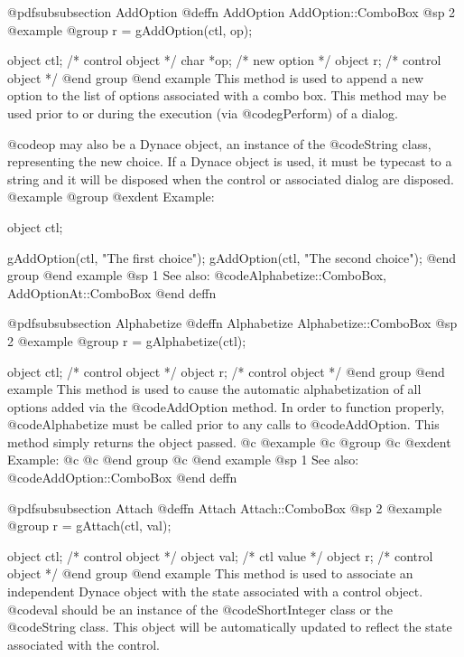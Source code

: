 @pdfsubsubsection {AddOption}
@deffn {AddOption} AddOption::ComboBox
@sp 2
@example
@group
r = gAddOption(ctl, op);

object  ctl;    /*  control object  */
char    *op;    /*  new option      */
object  r;      /*  control object  */
@end group
@end example
This method is used to append a new option to the list of options associated
with a combo box.  This method may be used prior to or during the execution
(via @code{gPerform}) of a dialog.

@code{op} may also be a Dynace object, an instance of the @code{String}
class, representing the new choice.  If a Dynace object is used, it must
be typecast to a string and it will be disposed when the control or
associated dialog are disposed.
@example
@group
@exdent Example:

object  ctl;

gAddOption(ctl, "The first choice");
gAddOption(ctl, "The second choice");
@end group
@end example
@sp 1
See also:  @code{Alphabetize::ComboBox, AddOptionAt::ComboBox}
@end deffn












@pdfsubsubsection {Alphabetize}
@deffn {Alphabetize} Alphabetize::ComboBox
@sp 2
@example
@group
r = gAlphabetize(ctl);

object  ctl;    /*  control object  */
object  r;      /*  control object  */
@end group
@end example
This method is used to cause the automatic alphabetization of all
options added via the @code{AddOption} method.  In order to function
properly, @code{Alphabetize} must be called prior to any calls to
@code{AddOption}.  This method simply returns the object passed.
@c @example
@c @group
@c @exdent Example:
@c 
@c @end group
@c @end example
@sp 1
See also:  @code{AddOption::ComboBox}
@end deffn












@pdfsubsubsection {Attach}
@deffn {Attach} Attach::ComboBox
@sp 2
@example
@group
r = gAttach(ctl, val);

object  ctl;   /*  control object  */
object  val;   /*  ctl value       */
object  r;     /*  control object  */
@end group
@end example
This method is used to associate an independent Dynace object with the
state associated with a control object.  @code{val} should be an
instance of the @code{ShortInteger} class or the @code{String} class.
This object will be automatically updated to reflect the state
associated with the control.

